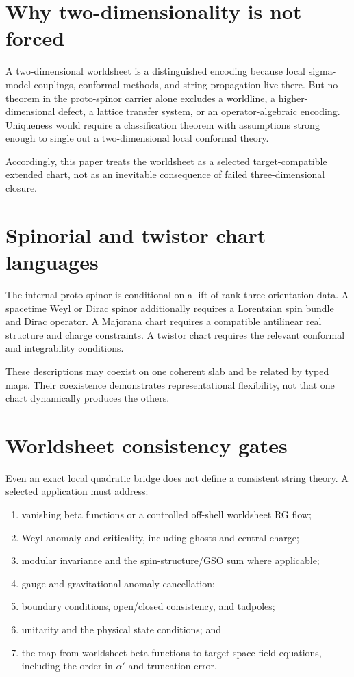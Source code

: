 \documentclass[11pt]{article}
\begin{document}
\section{Why two-dimensionality is not forced}

A two-dimensional worldsheet is a distinguished encoding because local
sigma-model couplings, conformal methods, and string propagation live there.
But no theorem in the proto-spinor carrier alone excludes a worldline, a
higher-dimensional defect, a lattice transfer system, or an operator-algebraic
encoding.  Uniqueness would require a classification theorem with assumptions
strong enough to single out a two-dimensional local conformal theory.

Accordingly, this paper treats the worldsheet as a selected target-compatible
extended chart, not as an inevitable consequence of failed three-dimensional
closure.

\section{Spinorial and twistor chart languages}

The internal proto-spinor is conditional on a lift of rank-three orientation
data.  A spacetime Weyl or Dirac spinor additionally requires a Lorentzian spin
bundle and Dirac operator.  A Majorana chart requires a compatible antilinear
real structure and charge constraints.  A twistor chart requires the relevant
conformal and integrability conditions.

These descriptions may coexist on one coherent slab and be related by typed
maps.  Their coexistence demonstrates representational flexibility, not that
one chart dynamically produces the others.

\section{Worldsheet consistency gates}

Even an exact local quadratic bridge does not define a consistent string
theory.  A selected application must address:
\begin{enumerate}
\item vanishing beta functions or a controlled off-shell worldsheet RG flow;
\item Weyl anomaly and criticality, including ghosts and central charge;
\item modular invariance and the spin-structure/GSO sum where applicable;
\item gauge and gravitational anomaly cancellation;
\item boundary conditions, open/closed consistency, and tadpoles;
\item unitarity and the physical state conditions; and
\item the map from worldsheet beta functions to target-space field equations,
including the order in $\alpha'$ and truncation error.
\end{enumerate}
\end{document}
